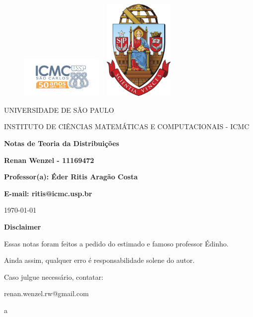 \documentclass[12pt]{article}
\theoremstyle{definition} %
\begin{document}
\begin{figure}[ht]
	\includegraphics[width=4cm]{../icmc.png}
	\hspace{7cm}
	\includegraphics[height=4.9cm,width=4cm]{../brasao_usp_cor.jpg}
	\endminipage
\end{figure}

\begin{center}
	\vspace{1cm}
	\LARGE
	UNIVERSIDADE DE SÃO PAULO

	\vspace{1.3cm}
	\LARGE
	INSTITUTO DE CIÊNCIAS MATEMÁTICAS E COMPUTACIONAIS - ICMC

	\vspace{1.7cm}
	\Large
	\textbf{Notas de Teoria da Distribuições}

	\vspace{1.3cm}
	\large
	\textbf{Renan Wenzel - 11169472}

	\vspace{1.3cm}
	\large
	\textbf{Professor(a): Éder Ritis Aragão Costa}

	\textbf{E-mail: ritis@icmc.usp.br}

	\vspace{1.3cm}
	\today
\end{center}

\newpage
\textbf{{\Huge Disclaimer}}

{\huge Essas notas foram feitos a pedido do estimado e famoso professor Édinho.

	Ainda assim, qualquer erro é responsabilidade solene do autor.

	Caso julgue necessário, contatar:

	renan.wenzel.rw@gmail.com}
\tableofcontents

\newpage


\newpage

\newpage

\newpage

\newpage

\newpage

\newpage

\newpage

\newpage

\begin{thebibliography}{99}
	a
\end{thebibliography}
\end{document}
